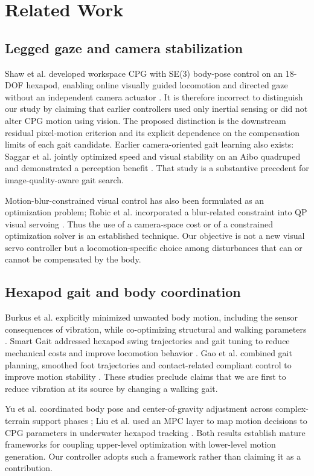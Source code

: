 \section{Related Work}
\subsection{Legged gaze and camera stabilization}
Shaw et al. developed workspace CPG with SE(3) body-pose control on an 18-DOF hexapod, enabling online visually guided locomotion and directed gaze without an independent camera actuator \cite{shaw2019}. It is therefore incorrect to distinguish our study by claiming that earlier controllers used only inertial sensing or did not alter CPG motion using vision. The proposed distinction is the downstream residual pixel-motion criterion and its explicit dependence on the compensation limits of each gait candidate. Earlier camera-oriented gait learning also exists: Saggar et al. jointly optimized speed and visual stability on an Aibo quadruped and demonstrated a perception benefit \cite{saggar2007}. That study is a substantive precedent for image-quality-aware gait search.

Motion-blur-constrained visual control has also been formulated as an optimization problem; Robic et al. incorporated a blur-related constraint into QP visual servoing \cite{robic2024}. Thus the use of a camera-space cost or of a constrained optimization solver is an established technique. Our objective is not a new visual servo controller but a locomotion-specific choice among disturbances that can or cannot be compensated by the body.

\subsection{Hexapod gait and body coordination}
Burkus et al. explicitly minimized unwanted body motion, including the sensor consequences of vibration, while co-optimizing structural and walking parameters \cite{burkus2022}. Smart Gait addressed hexapod swing trajectories and gait tuning to reduce mechanical costs and improve locomotion behavior \cite{yin2024}. Gao et al. combined gait planning, smoothed foot trajectories and contact-related compliant control to improve motion stability \cite{gao2022}. These studies preclude claims that we are first to reduce vibration at its source by changing a walking gait.

Yu et al. coordinated body pose and center-of-gravity adjustment across complex-terrain support phases \cite{yu2025}; Liu et al. used an MPC layer to map motion decisions to CPG parameters in underwater hexapod tracking \cite{liu2026}. Both results establish mature frameworks for coupling upper-level optimization with lower-level motion generation. Our controller adopts such a framework rather than claiming it as a contribution.

